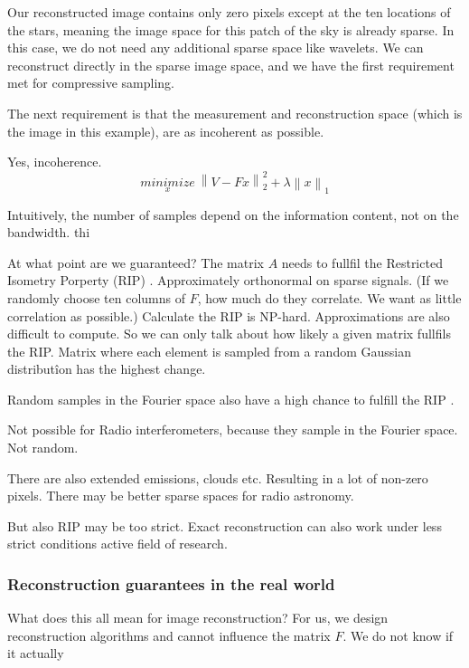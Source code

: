 Our reconstructed image contains only zero pixels except at the ten locations of the stars, meaning the image space for this patch of the sky is already sparse. In this case, we do not need any additional sparse space like wavelets. We can reconstruct directly in the sparse image space, and we have the first requirement met for compressive sampling. 

The next requirement is that the measurement and reconstruction space (which is the image in this example), are as incoherent as possible. 

Yes, incoherence.
\begin{equation}\label{intro:linear:compressed2}
\underset{x}{minimize} \: \left \| V - Fx \right \|_2^2 + \lambda \left \| x \right \|_1
\end{equation}


Intuitively, the number of samples depend on the information content, not on the bandwidth. thi


At what point are we guaranteed? The matrix $A$ needs to fullfil the Restricted Isometry Porperty (RIP) \cite{candes2006robust,donoho2006compressed}.
Approximately orthonormal on sparse signals. (If we randomly choose ten columns of $F$, how much do they correlate. We want as little correlation as possible.)
Calculate the RIP is NP-hard\cite{tillmann2013computational}. Approximations are also difficult to compute\cite{natarajan2014computational}.
So we can only talk about how likely a given matrix fullfils the RIP. Matrix where each element is sampled from a random Gaussian distributîon has the highest change.

Random samples in the Fourier space also have a high chance to fulfill the RIP \cite{haviv2017restricted}.

Not possible for Radio interferometers, because they sample in the Fourier space. Not random.

There are also extended emissions, clouds etc. Resulting in a lot of non-zero pixels. There may be better sparse spaces for radio astronomy.

But also RIP may be too strict. Exact reconstruction can also work under less strict conditions\cite{candes2011probabilistic} active field of research.

\subsubsection{Reconstruction guarantees in the real world}

What does this all mean for image reconstruction?
For us, we design reconstruction algorithms and cannot influence the matrix $F$. We do not know if it actually 

